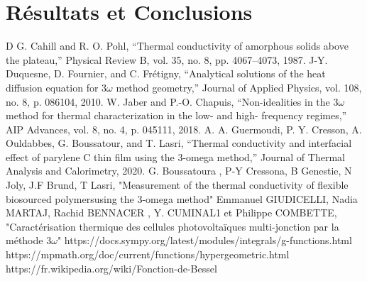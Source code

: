 \documentclass[10pt,a4paper]{report}
\begin{document}
\section{Résultats et Conclusions}


\begin{thebibliography}
D G. Cahill and R. O. Pohl, “Thermal conductivity of amorphous solids above the plateau,” Physical Review B,
vol. 35, no. 8, pp. 4067–4073, 1987.
\newline
\newline
J-Y. Duquesne, D. Fournier, and C. Frétigny, “Analytical solutions of the heat diffusion equation for 3$\omega$ method
geometry,” Journal of Applied Physics, vol. 108, no. 8, p. 086104, 2010.
\newline
\newline
 W. Jaber and P.-O. Chapuis, “Non-idealities in the 3$\omega$ method for thermal characterization in the low- and high-
frequency regimes,” AIP Advances, vol. 8, no. 4, p. 045111, 2018.
\newline
\newline
A. A. Guermoudi, P. Y. Cresson, A. Ouldabbes, G. Boussatour, and T. Lasri, “Thermal conductivity and
interfacial effect of parylene C thin film using the 3-omega method,” Journal of Thermal Analysis and
Calorimetry, 2020.
\newline
\newline
G. Boussatoura , P-Y Cressona, B Genestie, N Joly, J.F Brund, T Lasri, "Measurement of the thermal conductivity of flexible biosourced polymersusing the 3-omega method"
\newline
\newline
Emmanuel GIUDICELLI, Nadia MARTAJ, Rachid BENNACER , Y. CUMINAL1 et Philippe COMBETTE, "Caractérisation thermique des cellules photovoltaïques multi-jonction par la méthode 3$\omega$"
\newline
\newline
https://docs.sympy.org/latest/modules/integrals/g-functions.html
\newline
\newline
https://mpmath.org/doc/current/functions/hypergeometric.html
\newline
\newline
https://fr.wikipedia.org/wiki/Fonction-de-Bessel
\end{thebibliography}
\end{document}
